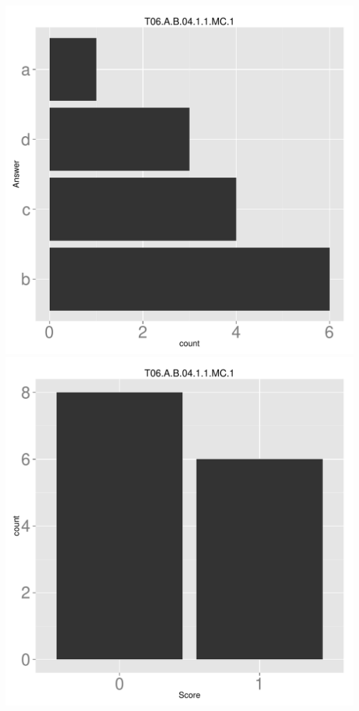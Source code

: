 \documentclass[12pt,english,nohyper]{tufte-handout}\usepackage[]{graphicx}\usepackage[]{color}
\begin{document}
\begin{center} \includegraphics[width=.45\linewidth]{Topic06_AB_5_answer} \includegraphics[width=.45\linewidth]{Topic06_AB_5_score} \end{center} 
\end{document}
